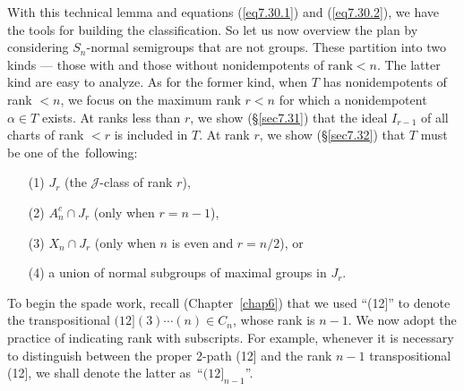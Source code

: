 \documentclass{surv-l}
\numberwithin{equation}{section}
\numberwithin{table}{section}
\numberwithin{figure}{section}
\theoremstyle{plain}
\theoremstyle{definition}
\begin{document}
With this technical lemma and equations (\ref{eq7.30.1}) and
(\ref{eq7.30.2}), we have the tools for building the
classification. So let us now overview the plan by considering
$S_{n}$-normal semigroups that are not groups. These partition
into two kinds --- those with and those without nonidempotents of
$\mathrm{rank}<n$. The latter kind are easy to analyze. As for the former
kind, when $T$ has nonidempotents of rank $<n$, we focus on the
maximum rank $r<n$ for which a nonidempotent $\alpha\in T$ exists.
At ranks less than $r$, we show (\S\ref{sec7.31}) that the ideal
$I_{r-1}$ of all charts of rank $<r$ is included in $T$. At rank
$r$, we show (\S\ref{sec7.32}) that $T$ must be one of
the~following:
\begin{enumerate}
\item[(1)] $J_{r}$ (the $\mathcal{J}$-class of rank $r$),

\item[(2)] $A_{n}^{c}\cap J_{r}$ (only when $r=n -1$),

\item[(3)] $X_{n}\cap J_{r}$ (only when $n$ is even and $r=n/2$), or

\item[(4)] a union of normal subgroups of maximal groups in $J_{r}$.
\end{enumerate}

To begin the spade work, recall (Chapter~\ref{chap6}) that we used
``(12]'' to denote the transpositional $(12](3)\cdots(n) \in
C_{n}$, whose rank is $n-1$. We now adopt the practice of
indicating rank with subscripts. For example, whenever it is
necessary to distinguish between the proper 2-path (12] and the
rank $n-1$ transpositional (12], we shall denote the latter
as~``$(12]_{n-1}$''.
\end{document}
